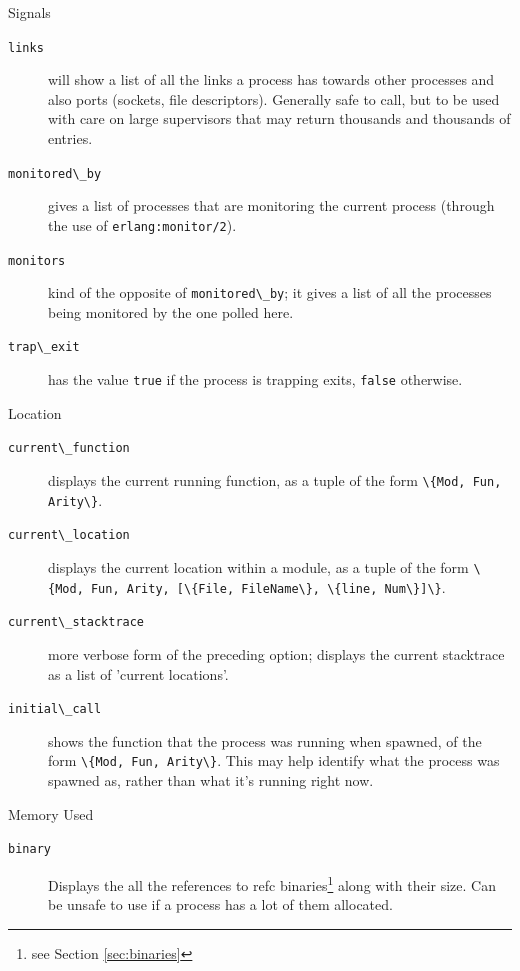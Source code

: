 \documentclass[11pt, oneside]{book}   	%
\newcommand{\function}[1]{\Verb`#1`}
\newcommand{\expression}[1]{\Verb`#1`}
\begin{document}
\begin{description*}
\begin{description}
		\end{description}
	\item[Signals] \hfill
		\begin{description}
			\item[\expression{links}] will show a list of all the links a process has towards other processes and also ports (sockets, file descriptors). Generally safe to call, but to be used with care on large supervisors that may return thousands and thousands of entries.
			
			\item[\expression{monitored\_by}] gives a list of processes that are monitoring the current process (through the use of \function{erlang:monitor/2}).
			
			\item[\expression{monitors}] kind of the opposite of \expression{monitored\_by}; it gives a list of all the processes being monitored by the one polled here.
					
			\item[\expression{trap\_exit}] has the value \expression{true} if the process is trapping exits, \expression{false} otherwise.
		\end{description}		
		
	\item[Location] \hfill
		\begin{description}
			\item[\expression{current\_function}] displays the current running function, as a tuple of the form \expression{\{Mod, Fun, Arity\}}.

			\item[\expression{current\_location}] displays the current location within a module, as a tuple of the form \expression{\{Mod, Fun, Arity, [\{File, FileName\}, \{line, Num\}]\}}.
			
			\item[\expression{current\_stacktrace}] more verbose form of the preceding option; displays the current stacktrace as a list of 'current locations'.
			
			\item[\expression{initial\_call}] shows the function that the process was running when spawned, of the form \expression{\{Mod, Fun, Arity\}}. This may help identify what the process was spawned as, rather than what it's running right now.
			
		\end{description}
	\item[Memory Used] \hfill
		\begin{description}
			\item[\expression{binary}] Displays the all the references to refc binaries\footnote{see Section \ref{sec:binaries}} along with their size. Can be unsafe to use if a process has a lot of them allocated.
			

\end{description}
\end{description*}
\end{document}
